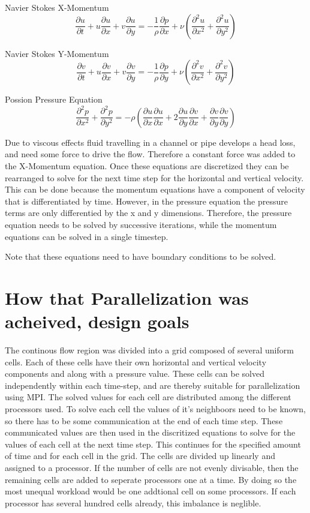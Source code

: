 \documentclass[12pt]{article}
\begin{document}
Navier Stokes X-Momentum
$$\frac{\partial u}{\partial t}+u\frac{\partial u}{\partial x}+v\frac{\partial u}{\partial y}=-\frac{1}{\rho}\frac{\partial p}{\partial x}+\nu\left(\frac{\partial^2 u}{\partial x^2}+\frac{\partial^2 u}{\partial y^2}\right)$$

Navier Stokes Y-Momentum
$$\frac{\partial v}{\partial t}+u\frac{\partial v}{\partial x}+v\frac{\partial v}{\partial y}=-\frac{1}{\rho}\frac{\partial p}{\partial y}+\nu\left(\frac{\partial^2 v}{\partial x^2}+\frac{\partial^2 v}{\partial y^2}\right)$$

Possion Pressure Equation
$$\frac{\partial^2 p}{\partial x^2}+\frac{\partial^2 p}{\partial y^2}=-\rho\left(\frac{\partial u}{\partial x}\frac{\partial u}{\partial x}+2\frac{\partial u}{\partial y}\frac{\partial v}{\partial x}+\frac{\partial v}{\partial y}\frac{\partial v}{\partial y}\right)
$$

Due to viscous effects fluid travelling in a channel or pipe develops a head loss, and need some force to drive the 
flow. Therefore a constant force was added to the X-Momentum equation. Once these equations are discretized they can 
be rearranged to solve for the next time step for the horizontal and vertical velocity. This can be done because the 
momentum equations have a component of velocity that is differentiated by time. However, in the pressure equation the 
pressure terms are only differentied by the x and y dimensions. Therefore, the pressure equation needs to be solved 
by successive iterations, while the momentum equations can be solved in a single timestep.

Note that these equations need to have boundary conditions to be solved. 

\section{How that Parallelization was acheived, design goals}

The continous flow region was divided into a grid composed of several uniform cells. Each of these cells have their 
own horizontal and vertical velocity components and along with a pressure value. These cells can be solved 
independently within each time-step, and are thereby suitable for parallelization using MPI. The solved values for 
each cell are distributed among the different processors used. To solve each cell the values of it's neighboors need 
to be known, so there has to be some communication at the end of each time step. These communicated values are then 
used in the discritized equations to solve for the values of each cell at the next time step. This continues for the 
specified amount of time and for each cell in the grid. The cells are divided up linearly and assigned to a processor. 
If the number of cells are not evenly divisable, then the remaining cells are added to seperate processors one at a 
time. By doing so the most unequal workload would be one addtional cell on some processors. If each processor has 
several hundred cells already, this imbalance is neglible.
\end{document}
